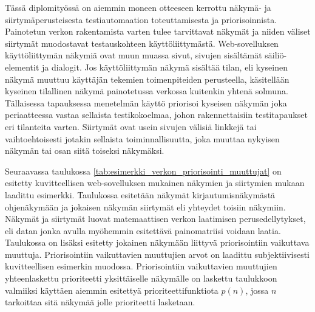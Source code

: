   Tässä diplomityössä on aiemmin moneen otteeseen kerrottu näkymä- ja siirtymäperusteisesta testiautomaation toteuttamisesta ja priorisoinnista.
  Painotetun verkon rakentamista varten tulee tarvittavat näkymät ja niiden väliset siirtymät muodostavat testauskohteen käyttöliittymästä.
  Web-sovelluksen käyttöliittymän näkymiä ovat muun muassa sivut, sivujen sisältämät säiliö-elementit ja dialogit.
  Jos käyttöliittymän näkymä sisältää tilan, eli kyseinen näkymä muuttuu käyttäjän tekemien toimenpiteiden perusteella, käsitellään kyseinen tilallinen näkymä painotetussa verkossa kuitenkin yhtenä solmuna.
  Tällaisessa tapauksessa menetelmän käyttö priorisoi kyseisen näkymän joka periaatteessa vastaa sellaista testikokoelmaa, johon rakennettaisiin testitapaukset eri tilanteita varten.
  Siirtymät ovat usein sivujen välisiä linkkejä tai vaihtoehtoisesti jotakin sellaista toiminnallisuutta, joka muuttaa nykyisen näkymän tai osan siitä toiseksi näkymäksi.

  Seuraavassa taulukossa \ref{tab:esimerkki_verkon_priorisointi_muuttujat} on esitetty kuvitteellisen web-sovelluksen mukainen näkymien ja siirtymien mukaan laadittu esimerkki.
  Taulukossa esitetään näkymät kirjautumisnäkymästä ohjenäkymään ja jokaisen näkymän siirtymät eli yhteydet toisiin näkymiin.
  Näkymät ja siirtymät luovat matemaattisen verkon laatimisen perusedellytykset, eli datan jonka avulla myöhemmin esitettävä painomatriisi voidaan laatia.
  Taulukossa on lisäksi esitetty jokainen näkymään liittyvä priorisointiin vaikuttava muuttuja.
  Priorisointiin vaikuttavien muuttujien arvot on laadittu subjektiivisesti kuvitteellisen esimerkin muodossa.
  Priorisointiin vaikuttavien muuttujien yhteenlaskettu prioriteetti yksittäiselle näkymälle on laskettu taulukkoon valmiiksi käyttäen aiemmin esitettyä prioriteettifunktiota \(p(n)\), jossa \(n\) tarkoittaa sitä näkymää jolle prioriteetti lasketaan.

